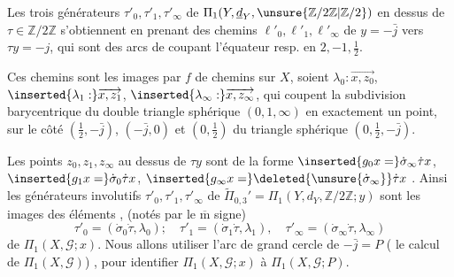 Les trois générateurs 
 $\tau'_0,\tau'_1,\tau'_\infty$
de $\Pi_1(Y,\underline{d}_Y,
\unsure{\mathbb Z/2\mathbb Z|\mathbb Z/2})$
en dessus de $\tau\in\mathbb Z/2\mathbb Z$
s'obtiennent en prenant des chemins $\ell'_0,\ell'_1,\ell'_\infty$
de  $y=-\bar j$ vers
 $\tau y=-j$, qui sont des arcs de
 coupant l'équateur resp. en $2,-1,\frac12$.



Ces chemins sont les images par $f$ de chemins
sur $X$, soient $\lambda_0:\overrightarrow{x,z_0}$,
$\inserted{\lambda_1:}\overrightarrow{x,z_1}$,
$\inserted{\lambda_\infty:}\overrightarrow{x,z_\infty}$,
qui coupent  la subdivision barycentrique du double
triangle sphérique $(0,1,\infty)$ en exactement un point,
  sur le côté
$(\frac12,-\bar j)$, $(-\bar j,0)$ et $(0,\frac12)$
du triangle sphérique $(0,\frac12,-\bar j)$.


Les points  $z_0,z_1,z_\infty$ au dessus de
$\tau y$ sont  de la forme
$\inserted{g_0x=}\dot\sigma_\infty\dot\tau x$,
$\inserted{g_1x=}\dot\sigma_0\dot\tau x$,
$\inserted{g_\infty x=}\deleted{\unsure{\dot\sigma_\infty}}\dot\tau x$
.
Ainsi les générateurs involutifs
$\tau'_0,\tau'_1,\tau'_\infty$ de
$\widetilde\Pi_{0,3}'=\Pi_1(Y,d_Y,\mathbb Z/2\mathbb Z;y)$
sont les images des éléments
,
(notés par le $\overline{\mathrm m}$ signe)
\[
\tau'_0=(\dot\sigma_0\dot\tau,\lambda_0);\quad
\tau'_1=(\dot\sigma_1\dot\tau,\lambda_1),\quad
\tau'_\infty=(\dot\sigma_\infty\dot\tau,\lambda_\infty)
\]
de $\Pi_1(X,\mathcal G;x)$.
Nous allons utiliser l'arc de grand cercle \inserted{$\ell$}
de  $-\bar j=P$
( 
  le calcul de $\Pi_1(X,\mathcal G)$)
, pour identifier $\Pi_1(X,\mathcal G;x)$
à $\Pi_1(X,\mathcal G;P)$.

